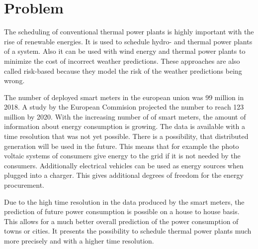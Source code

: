 \section{Problem}

The scheduling of conventional thermal power plants is highly important
with the rise of renewable energies.
It is used to schedule hydro- and thermal power plants of a system.
\cite{Banos2011}
Also it can be used with wind energy and thermal power plants
to minimize the cost of incorrect weather predictions.
These approaches are also called risk-based
because they model the risk of the weather predictions being wrong.
\cite{Chen2008,Abujarad2017}

The number of deployed smart meters in the european union was 99 million in 2018.
A study by the European Commision projected the number to reach 123 million by 2020.
\cite{Vlachogiannis2019}
With the increasing number of of smart meters,
the amount of information about energy consumption is growing.
The data is available with a time resolution that was not yet possible.
There is a possibility, that distributed generation will be used in the future.
This means that for example the photo voltaic systems of consumers
give energy to the grid if it is not needed by the consumers.
Additionally electrical vehicles can be used as energy sources when plugged into a charger.
This gives additional degrees of freedom for the energy procurement.
\cite{Aiello2016,Zhang2016}

Due to the high time resolution in the data produced by the smart meters,
the prediction of future power consumption is possible on a house to house basis.
This allows for a much better overall prediction of the power consumption of towns or cities.
\cite{Basu2013}
It presents the possibility to schedule thermal power plants much more precisely
and with a higher time resolution.
